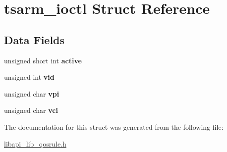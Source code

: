 \hypertarget{structtsarm__ioctl}{}\section{tsarm\+\_\+ioctl Struct Reference}
\label{structtsarm__ioctl}
\subsection*{Data Fields}
\begin{DoxyCompactItemize}
\item 
\mbox{\label{structtsarm__ioctl_abbc7f283bbf7947dc0611bb7132adb43}} 
unsigned short int {\bfseries active}
\item 
\mbox{\label{structtsarm__ioctl_a99d6992740505fa0ea20383d7ffecf84}} 
unsigned int {\bfseries vid}
\item 
\mbox{\label{structtsarm__ioctl_a025d98bc70a400336e83c5b87fcfbcd1}} 
unsigned char {\bfseries vpi}
\item 
\mbox{\label{structtsarm__ioctl_ab038deb7c6f2c66e23c21976d11cc2b7}} 
unsigned char {\bfseries vci}
\end{DoxyCompactItemize}


The documentation for this struct was generated from the following file\+:\begin{DoxyCompactItemize}
\item 
\hyperlink{libapi__lib__qosrule_8h}{libapi\+\_\+lib\+\_\+qosrule.\+h}\end{DoxyCompactItemize}
